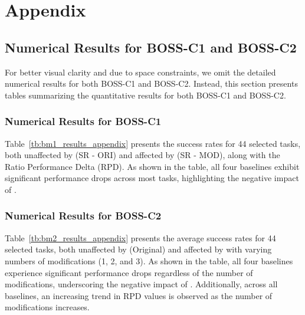 \section{Appendix}








\subsection{Numerical Results for BOSS-C1 and BOSS-C2}
For better visual clarity and due to space constraints, we omit the detailed numerical results for both BOSS-C1 and BOSS-C2. Instead, this section presents tables summarizing the quantitative results for both BOSS-C1 and BOSS-C2.

\subsubsection{Numerical Results for BOSS-C1}


Table~\ref{tb:bm1_results_appendix} presents the success rates for 44 selected tasks, both unaffected by \pb (SR - ORI) and affected by \pb (SR - MOD), along with the Ratio Performance Delta (RPD). As shown in the table, all four baselines exhibit significant performance drops across most tasks, highlighting the negative impact of \pb.


\subsubsection{Numerical Results for BOSS-C2}


Table~\ref{tb:bm2_results_appendix} presents the average success rates for 44 selected tasks, both unaffected by \pb (Original) and affected by \pb with varying numbers of modifications (1, 2, and 3). As shown in the table, all four baselines experience significant performance drops regardless of the number of modifications, underscoring the negative impact of \pb. Additionally, across all baselines, an increasing trend in RPD values is observed as the number of modifications increases.


